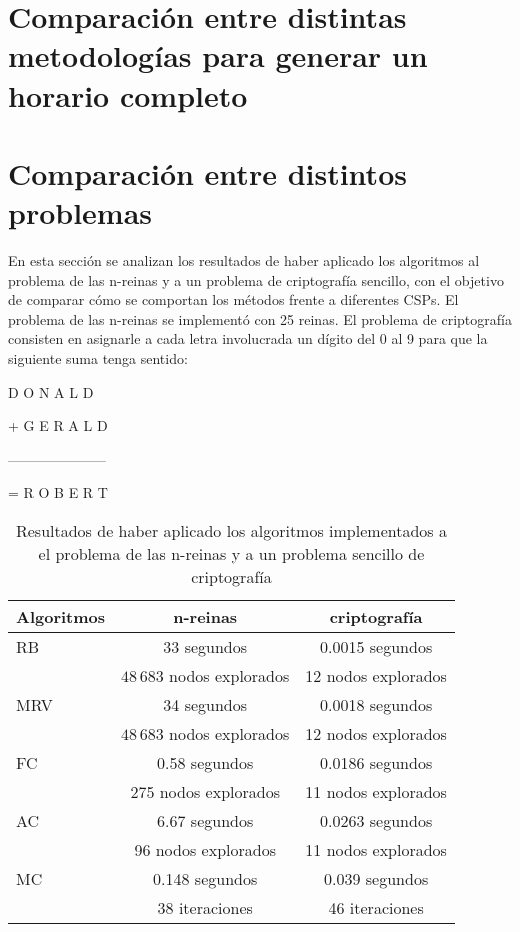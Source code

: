 \section{Comparaci\'on entre distintas metodolog\'ias para generar un horario completo}

\section{Comparaci\'on entre distintos problemas}

En esta secci\'on se analizan los resultados de haber aplicado los algoritmos al problema de las n-reinas y a un problema de criptograf\'ia sencillo, con el objetivo de comparar c\'omo se comportan los m\'etodos frente a diferentes CSPs. El problema de las n-reinas se implement\'o con 25 reinas. El problema de criptograf\'ia consisten en asignarle a cada letra involucrada un d\'igito del 0 al 9 para que la siguiente suma tenga sentido:

\begin{center}
\quad D O N A L D
	
+ G E R A L D

---------------------

= R O B E R T
\end{center}

\begin{table}[h]
	\caption{Resultados de haber aplicado los algoritmos implementados a el problema de las n-reinas y a un problema sencillo de criptograf\'ia}
	\begin{center}
		\label{2problemas}
		\begin{tabular}{|l|c|c||}
			\hline \hline
			Algoritmos & n-reinas & criptograf\'ia \\ \hline
			RB & 33 segundos & 0.0015 segundos \\
			 & $48\,683$ nodos explorados & 12 nodos explorados \\ \hline
			MRV & 34 segundos &  0.0018 segundos \\
			 & $48\,683$ nodos explorados & 12 nodos explorados \\ \hline
			FC & 0.58 segundos & 0.0186 segundos \\
			 & 275 nodos explorados & 11 nodos explorados \\ \hline
			AC & 6.67 segundos &  0.0263 segundos \\
			 & 96 nodos explorados & 11 nodos explorados \\ \hline
			MC & 0.148 segundos & 0.039 segundos \\
			 & 38 iteraciones & 46 iteraciones \\ \hline
		\end{tabular}
	\end{center}
\end{table}


